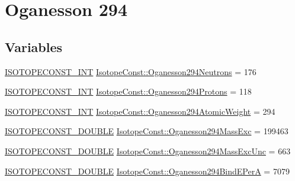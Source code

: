\hypertarget{group___isotope_const-_oganesson-_og294}{}\section{Oganesson 294}
\label{group___isotope_const-_oganesson-_og294}
\subsection*{Variables}
\begin{DoxyCompactItemize}
\item 
\mbox{\hyperlink{group___isotope_const-_macros_ga5f18360b3e99483a35c32d789e62621c}{I\+S\+O\+T\+O\+P\+E\+C\+O\+N\+S\+T\+\_\+\+I\+NT}} \mbox{\hyperlink{group___isotope_const-_oganesson-_og294_ga996d406bd754bc387189003204853ed7}{Isotope\+Const\+::\+Oganesson294\+Neutrons}} = 176
\item 
\mbox{\hyperlink{group___isotope_const-_macros_ga5f18360b3e99483a35c32d789e62621c}{I\+S\+O\+T\+O\+P\+E\+C\+O\+N\+S\+T\+\_\+\+I\+NT}} \mbox{\hyperlink{group___isotope_const-_oganesson-_og294_gaac6e3d391c83c20225a5ab80f8a4b6e0}{Isotope\+Const\+::\+Oganesson294\+Protons}} = 118
\item 
\mbox{\hyperlink{group___isotope_const-_macros_ga5f18360b3e99483a35c32d789e62621c}{I\+S\+O\+T\+O\+P\+E\+C\+O\+N\+S\+T\+\_\+\+I\+NT}} \mbox{\hyperlink{group___isotope_const-_oganesson-_og294_ga476ba86e2b5b78b916da3b2f87b18e5a}{Isotope\+Const\+::\+Oganesson294\+Atomic\+Weight}} = 294
\item 
\mbox{\hyperlink{group___isotope_const-_macros_ga8f45a7272ce02c0b4c65c44636ed719a}{I\+S\+O\+T\+O\+P\+E\+C\+O\+N\+S\+T\+\_\+\+D\+O\+U\+B\+LE}} \mbox{\hyperlink{group___isotope_const-_oganesson-_og294_ga74989bd4a2119ca484c48826eab0c764}{Isotope\+Const\+::\+Oganesson294\+Mass\+Exc}} = 199463
\item 
\mbox{\hyperlink{group___isotope_const-_macros_ga8f45a7272ce02c0b4c65c44636ed719a}{I\+S\+O\+T\+O\+P\+E\+C\+O\+N\+S\+T\+\_\+\+D\+O\+U\+B\+LE}} \mbox{\hyperlink{group___isotope_const-_oganesson-_og294_ga971c6846f671c1c77ce85b0342ffb40e}{Isotope\+Const\+::\+Oganesson294\+Mass\+Exc\+Unc}} = 663
\item 
\mbox{\hyperlink{group___isotope_const-_macros_ga8f45a7272ce02c0b4c65c44636ed719a}{I\+S\+O\+T\+O\+P\+E\+C\+O\+N\+S\+T\+\_\+\+D\+O\+U\+B\+LE}} \mbox{\hyperlink{group___isotope_const-_oganesson-_og294_ga109b204574a8f79656ea2be445410f4e}{Isotope\+Const\+::\+Oganesson294\+Bind\+E\+PerA}} = 7079
\item 

\end{DoxyCompactItemize}
